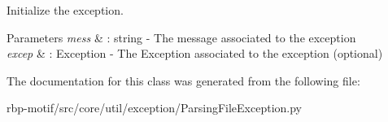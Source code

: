 Initialize the exception. 


\begin{DoxyParams}{Parameters}
{\em mess} & \-: string -\/ The message associated to the exception \\
\hline
{\em excep} & \-: Exception -\/ The Exception associated to the exception (optional) \\
\hline
\end{DoxyParams}


The documentation for this class was generated from the following file\-:\begin{DoxyCompactItemize}
\item 
rbp-\/motif/src/core/util/exception/Parsing\-File\-Exception.\-py\end{DoxyCompactItemize}
